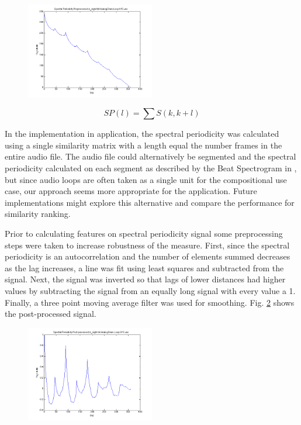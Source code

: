 \documentclass{article}
\begin{document}
\begin{figure}[h!]
	
  \centering
    \includegraphics[width=0.5\textwidth]{bs_pre.png}
      \caption{}\label{fig:bs1_pre}
\end{figure}

\begin{equation}
\label{eq:bs}
SP(l) = \sum S(k, k+l)
\end{equation}

In the implementation in application, the spectral periodicity was calculated using a single similarity matrix with a length equal the number frames in the entire audio file. The audio file could alternatively be segmented and the spectral periodicity calculated on each segment as described by the Beat Spectrogram in \cite{foote2001beat}, but since audio loops are often taken as a single unit for the compositional use case, our approach seems more appropriate for the application. Future implementations might explore this alternative and compare the performance for similarity ranking.

Prior to calculating features on spectral periodicity signal some preprocessing steps were taken to increase robustness of the measure. First, since the spectral periodicity is an autocorrelation and the number of elements summed decreases as the lag increases, a line was fit using least squares and subtracted from the signal. Next, the signal was inverted so that lags of lower distances had higher values by subtracting the signal from an equally long signal with every value a 1. Finally, a three point moving average filter was used for smoothing. Fig. \ref{fig:bs1_post} shows the post-processed signal.

\begin{figure}[h!]
  \centering
    \includegraphics[width=0.5\textwidth]{bs_post.png}
      \caption{}	\label{fig:bs1_post}
\end{figure}
\end{document}
